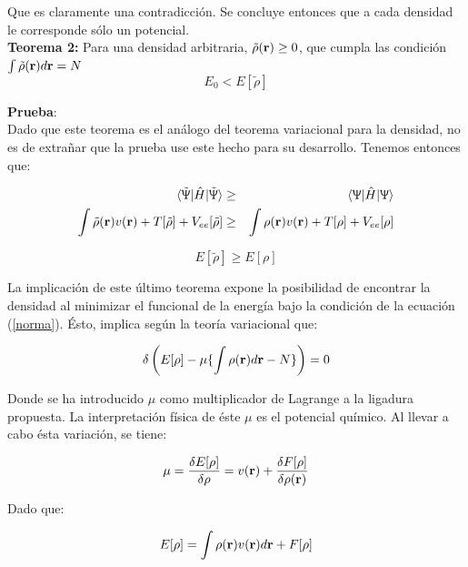 \documentclass [11pt]{article}
\begin{document}
Que es claramente una contradicción. Se concluye entonces que a cada densidad le corresponde sólo un potencial.\\

{\bf Teorema 2:} Para una densidad arbitraria, $\tilde \rho({\bf r}) \geq 0$, que cumpla las condición $\int \tilde\rho({\bf r})d{\bf r}=N$\\
\begin{equation}
    E_0<E[\tilde\rho]
\end{equation}	

{\bf Prueba}:\\
Dado que este teorema es el análogo del teorema variacional para la densidad, no es de extrañar que la prueba use este hecho para su desarrollo. Tenemos entonces que:

\begin{eqnarray*}
    \langle\tilde\Uppsi|\hat H|\tilde\Uppsi\rangle & \geq & \langle\Uppsi|\hat H|\Uppsi\rangle\\
    \int \tilde\rho({\bf r})v({\bf r})+T[\tilde\rho]+V_{ee}[\tilde\rho] & \geq & \int \rho({\bf r})v({\bf r})+T[\rho]+V_{ee}[\rho]
\end{eqnarray*}

\begin{equation}
    E[\tilde\rho]  \geq  E[\rho]
\end{equation}

La implicación de este último teorema expone la posibilidad de encontrar la densidad al minimizar el funcional de la energía bajo la condición de la ecuación (\ref{norma}). Ésto, implica según la teoría variacional que:

\begin{equation}\label{minimization}
	\delta\left(E[\rho]-\mu\{\int \rho({\bf r})d{\bf r}-N\}\right)=0
\end{equation}	

Donde se ha introducido $\mu$ como multiplicador de Lagrange a la ligadura propuesta. La interpretación física de éste $\mu$ es el potencial químico. Al llevar a cabo ésta variación, se tiene:

\begin{equation}
	\mu=\frac{\delta E[\rho]}{\delta \rho}=v({\bf r})+\frac{\delta F[\rho]}{\delta\rho({\bf r})}
\end{equation}

Dado que:

\begin{equation}
	E[\rho]=\int \rho({\bf r})v({\bf r})d{\bf r}+F[\rho]
\end{equation}
\end{document}
